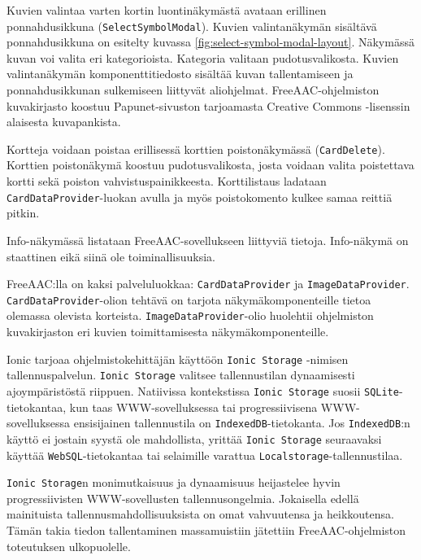 \documentclass[utf8]{gradu3}
\begin{document}
Kuvien valintaa varten kortin luontinäkymästä avataan erillinen ponnahdusikkuna \linebreak[4](\texttt{SelectSymbolModal}). Kuvien valintanäkymän sisältävä ponnahdusikkuna on esitelty kuvassa \ref{fig:select-symbol-modal-layout}. Näkymässä kuvan voi valita eri kategorioista. Kategoria valitaan pudotusvalikosta. Kuvien valintanäkymän komponenttitiedosto sisältää kuvan tallentamiseen ja ponnahdusikkunan sulkemiseen liittyvät aliohjelmat. FreeAAC-ohjelmiston kuvakirjasto koostuu Papunet-sivuston tarjoamasta Creative Commons -lisenssin alaisesta kuvapankista.

Kortteja voidaan poistaa erillisessä korttien poistonäkymässä  (\texttt{CardDelete}). Korttien poistonäkymä koostuu pudotusvalikosta, josta voidaan valita poistettava kortti sekä poiston vahvistuspainikkeesta. Korttilistaus ladataan \texttt{CardDataProvider}-luokan avulla ja myös poistokomento kulkee samaa reittiä pitkin.

Info-näkymässä listataan FreeAAC-sovellukseen liittyviä tietoja. Info-näkymä on staattinen eikä siinä ole toiminallisuuksia.

FreeAAC:lla on kaksi palveluluokkaa: \texttt{CardDataProvider} ja \texttt{ImageDataProvider}. \texttt{CardDataProvider}-olion tehtävä on tarjota näkymäkomponenteille tietoa olemassa olevista korteista. \texttt{ImageDataProvider}-olio huolehtii ohjelmiston kuvakirjaston eri kuvien toimittamisesta näkymäkomponenteille.

Ionic tarjoaa ohjelmistokehittäjän käyttöön \texttt{Ionic Storage} -nimisen tallennuspalvelun. \texttt{Ionic Storage} valitsee tallennustilan dynaamisesti ajoympäristöstä riippuen. Natiivissa kontekstissa \texttt{Ionic Storage} suosii \texttt{SQLite}-tietokantaa, kun taas WWW-sovelluksessa tai progressiivisena WWW-sovelluksessa ensisijainen tallennustila on \texttt{IndexedDB}\nobreakdash-\hspace{0pt}tietokanta. Jos \texttt{IndexedDB}:n käyttö ei jostain syystä ole mahdollista, yrittää \texttt{Ionic Storage} seuraavaksi käyttää \texttt{WebSQL}-tietokantaa tai selaimille varattua \texttt{Localstorage}\nobreakdash-\hspace{0pt}tallennustilaa.

\texttt{Ionic Storage}n monimutkaisuus ja dynaamisuus heijastelee hyvin progressiivisten \linebreak[4]WWW-sovellusten tallennusongelmia. Jokaisella edellä mainituista tallennusmahdollisuuksista on omat vahvuutensa ja heikkoutensa. Tämän takia tiedon tallentaminen massamuistiin jätettiin FreeAAC-ohjelmiston toteutuksen ulkopuolelle.
\end{document}
